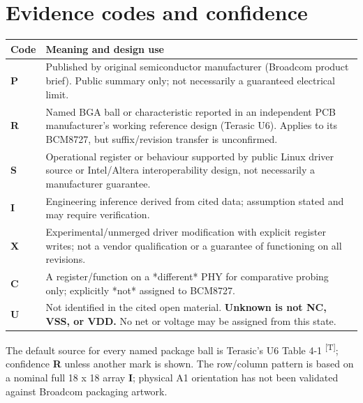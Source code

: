 \documentclass[10pt,a4paper]{article}
\newcommand{\m}[1]{\textsf{\color{blue}\bfseries #1}}
\newcommand{\unk}{\textsf{\color{amber}\bfseries U}}
\newcommand{\src}[1]{\textsuperscript{[#1]}}
\begin{document}
\section{Evidence codes and confidence}
\begin{tabularx}{\linewidth}{@{}p{20mm}X@{}}\toprule
\textbf{Code} & \textbf{Meaning and design use} \\\midrule
\m{P} & Published by original semiconductor manufacturer (Broadcom product brief). Public summary only; not necessarily a guaranteed electrical limit. \\
\m{R} & Named BGA ball or characteristic reported in an independent PCB manufacturer's working reference design (Terasic U6). Applies to its BCM8727, but suffix/revision transfer is unconfirmed. \\
\m{S} & Operational register or behaviour supported by public Linux driver source or Intel/Altera interoperability design, not necessarily a manufacturer guarantee. \\
\m{I} & Engineering inference derived from cited data; assumption stated and may require verification. \\
\m{X} & Experimental/unmerged driver modification with explicit register writes; not a vendor qualification or a guarantee of functioning on all revisions. \\
\m{C} & A register/function on a *different* PHY for comparative probing only; explicitly *not* assigned to BCM8727. \\
\unk & Not identified in the cited open material. \textbf{Unknown is not NC, VSS, or VDD.} No net or voltage may be assigned from this state. \\\bottomrule
\end{tabularx}
The default source for every named package ball is Terasic's U6 Table 4-1 \src{T}; confidence \m{R} unless another mark is shown. The row/column pattern is based on a nominal full 18 x 18 array \m{I}; physical A1 orientation has not been validated against Broadcom packaging artwork.
\end{document}
